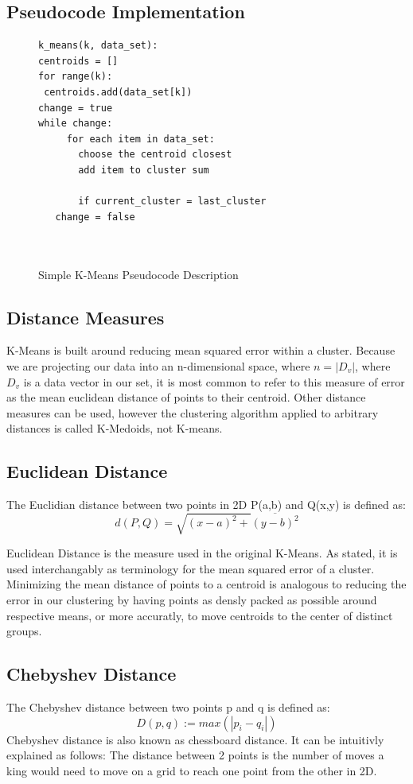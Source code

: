 \documentclass[journal]{IEEEtran}
\begin{document}
\subsection{Pseudocode Implementation}
\begin{figure}[h]
	
	\caption{Simple K-Means Pseudocode Description}
	\begin{lstlisting}
k_means(k, data_set):
centroids = []
for range(k):
 centroids.add(data_set[k])
change = true
while change:
     for each item in data_set:
       choose the centroid closest
       add item to cluster sum
			
       if current_cluster = last_cluster
   change = false
			
			
	\end{lstlisting}
\end{figure}

\subsection{Distance Measures}
K-Means is built around reducing mean squared error within a cluster. Because we are projecting our data into an n-dimensional space, where $n = |D_{v}|$, where $D_{v}$ is a data vector in our set, it is most common to refer to this measure of error as the mean euclidean distance of points to their centroid. Other distance measures can be used, however the clustering algorithm applied to arbitrary distances is called K-Medoids, not K-means.
\subsection{Euclidean Distance}

The Euclidian distance between two points in 2D P(a,b) and Q(x,y) is defined as:
$$d(P, Q)= \sqrt{(x - a)^{2} +} \overline{(y - b)^{2}}$$

Euclidean Distance is the measure used in the original K-Means. As stated, it is used interchangably as terminology for the mean squared error of a cluster. Minimizing the mean distance of points to a centroid is analogous to reducing the error in our clustering by having points as densly packed as possible around respective means, or more accuratly, to move centroids to the center of distinct groups.
\subsection{Chebyshev Distance}
The Chebyshev distance between two points p and q is defined as:
$$D(p,q):= max(|p_{i}-q_{i}|)$$
Chebyshev distance is also known as chessboard distance. It can be intuitivly explained as follows: The distance between 2 points is the number of moves a king would need to move on a grid to reach one point from the other in 2D. 
\end{document}
